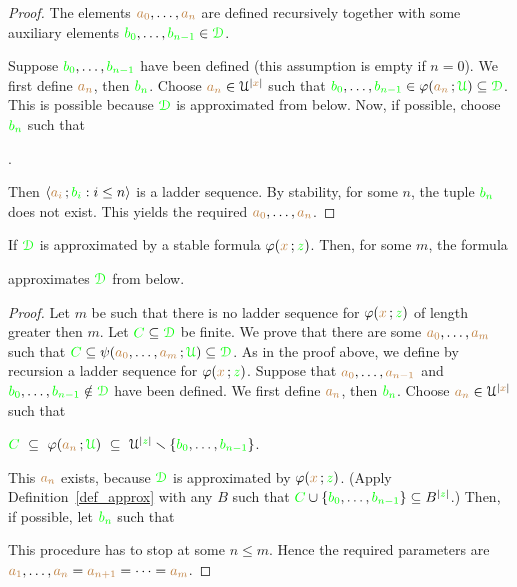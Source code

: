 \documentclass[creche.tex]{subfiles}
\begin{document}
\begin{proof}
The elements ${\color{brown} a_0},\dots,{\color{brown} a_n}$ are defined recursively together with some auxiliary elements ${\color{green} b_0},\dots,{\color{green} b_{n-1}}\in{\color{green}\EuScript D}$.

Suppose ${\color{green} b_0},\dots,{\color{green} b_{n-1}}$ have been defined (this assumption is empty if $n=0$).
We first define ${\color{brown} a_n}$, then ${\color{green} b_n}$. 
Choose ${\color{brown} a_n}\in\EuScript U^{|{\color{brown} x}|}$ such that ${\color{green} b_0},\dots,{\color{green} b_{n-1}}\in\varphi({\color{brown} a_n}\,;{\color{green}\EuScript U})\subseteq{\color{green}\EuScript D}$.
This is possible because ${\color{green}\EuScript D}$ is approximated from below.
Now, if possible, choose ${\color{green} b_n}$ such that

.

Then $\langle{\color{brown}a_i}\,;{\color{green} b_i} : i\le n\rangle$ is a ladder sequence. 
By stability, for some $n$, the tuple ${\color{green} b_n}$ does not exist.
This yields the required ${\color{brown} a_0},\dots,{\color{brown} a_n}$.
\end{proof}


\begin{lemma}
If ${\color{green}\EuScript D}$ is approximated by a stable formula $\varphi({\color{brown} x}\,;{\color{green} z})$.
Then, for some $m$, the formula 


approximates ${\color{green}\EuScript D}$ from below.
\end{lemma}

\begin{proof}
Let $m$ be such that there is no ladder sequence for $\varphi({\color{brown} x}\,;{\color{green} z})$ of length greater then $m$.
Let ${\color{green} C}\subseteq{\color{green}\EuScript D}$ be finite.
We prove that there are some ${\color{brown} a_0},\dots,{\color{brown} a_m}$ such that ${\color{green} C}\subseteq\psi({\color{brown} a_0},\dots,{\color{brown} a_m}\,;{\color{green}\EuScript U})\subseteq{\color{green}\EuScript D}$.
As in the proof above, we define by recursion a ladder sequence for $\varphi({\color{brown} x}\,;{\color{green} z})$.
Suppose that ${\color{brown} a_0},\dots,{\color{brown} a_{n-1}}$ and ${\color{green} b_0},\dots,{\color{green} b_{n-1}}\notin{\color{green}\EuScript D}$ have been defined.
We first define ${\color{brown} a_n}$, then ${\color{green} b_n}$. 
Choose ${\color{brown} a_n}\in\EuScript U^{|{\color{brown} x}|}$ such that 

\hfil${\color{green} C}\ \subseteq\ \varphi({\color{brown} a_n}\,;{\color{green}\EuScript U})\ \subseteq\ \EuScript U^{|{\color{green} z}|}\smallsetminus\{{\color{green} b_0},\dots,{\color{green} b_{n-1}}\}$.

This ${\color{brown} a_n}$ exists, because ${\color{green}\EuScript D}$ is approximated by $\varphi({\color{brown} x}\,;{\color{green} z})$.
(Apply Definition~\ref{def_approx} with any $B$ such that ${\color{green} C}\cup\{{\color{green} b_0},\dots,{\color{green} b_{n-1}}\}\subseteq B^{|{\color{green} z}|}$.)
Then, if possible, let ${\color{green} b_n}$ such that


This procedure has to stop at some $n\le m$.
Hence the required parameters are ${\color{brown} a_1},\dots,{\color{brown} a_n}={\color{brown} a_{n+1}}=\dots={\color{brown} a_{m}}$.
\end{proof}
\end{document}
